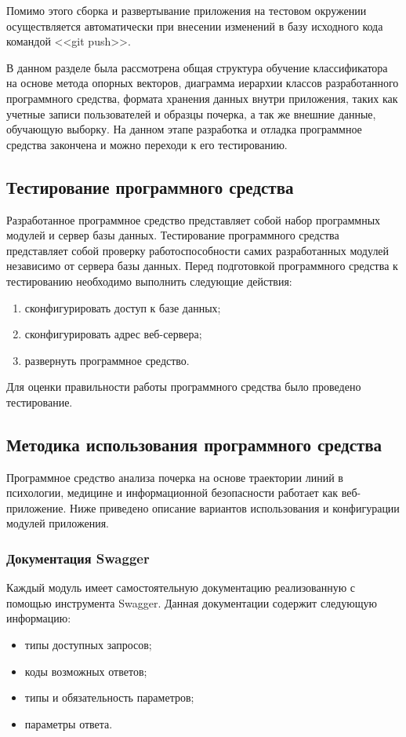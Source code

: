 Помимо этого сборка и развертывание приложения на тестовом окружении осуществляется автоматически при внесении изменений в базу исходного кода командой <<git push>>.

В данном разделе была рассмотрена общая структура обучение классификатора на основе метода опорных векторов, диаграмма иерархии классов разработанного программного средства, формата хранения данных внутри приложения, таких как учетные записи пользователей и образцы почерка, а так же внешние данные, обучающую выборку. На данном этапе разработка и отладка программное средства закончена и можно переходи к его тестированию.

\subsection{Тестирование программного средства}
\label{sec:testing}
Разработанное программное средство представляет собой набор программных модулей и сервер базы данных. Тестирование программного средства представляет собой проверку работоспособности самих разработанных модулей независимо от сервера базы данных. 
Перед подготовкой программного средства к тестированию необходимо выполнить следующие действия:
\begin{enumerate}
  \item сконфигурировать доступ к базе данных;
  \item сконфигурировать адрес веб-сервера;
  \item развернуть программное средство.
\end{enumerate}

Для оценки правильности работы программного средства было проведено тестирование.

\subsection{Методика использования программного средства}
\label{sec:manpage:admin_man}
Программное средство анализа почерка на основе траектории линий в психологии, медицине и информационной безопасности работает как веб-приложение. Ниже приведено описание вариантов использования и конфигурации модулей приложения.

\subsubsection{Документация Swagger}
Каждый модуль имеет самостоятельную документацию реализованную с помощью инструмента Swagger.
Данная документации содержит следующую информацию:
\begin{itemize}
    \item типы доступных запросов;
    \item коды возможных ответов;
    \item типы и обязательность параметров;
    \item параметры ответа.
\end{itemize}

